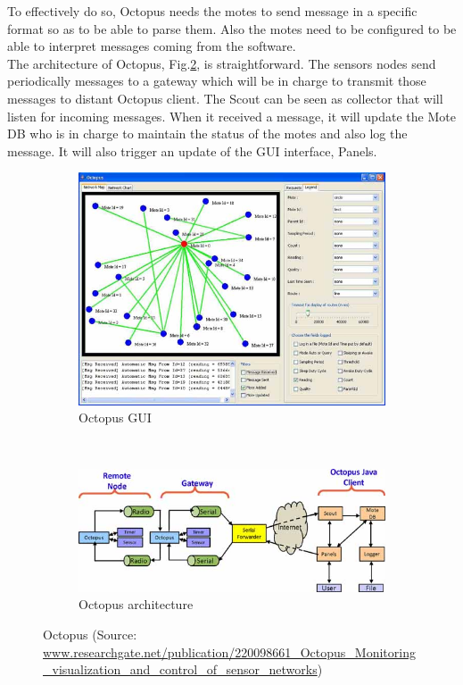 To effectively do so, Octopus needs the motes to send message in a specific format so as to be able to parse them. Also the motes need to be configured to be able to interpret messages coming from the software.\\

The architecture of Octopus, Fig.\ref{fig:octopus_archi}, is straightforward. The sensors nodes send periodically messages to a gateway which will be in charge to transmit those messages to distant Octopus client. The Scout can be seen as collector that will listen for incoming messages. When it received a message, it will update the Mote DB who is in charge to maintain the status of the motes and also log the message. It will also trigger an update of the GUI interface, Panels.

\begin{figure}
    \centering
    \begin{subfigure}[b]{0.5\textwidth}
      \includegraphics[width=\textwidth]{res/octopus.png}
      \caption{Octopus GUI}
      \label{fig:octopus_gui}
    \end{subfigure}
    ~
    \begin{subfigure}[b]{0.5\textwidth}
        \includegraphics[width=\textwidth]{res/octopus_archi.png}
        \caption{Octopus architecture}
        \label{fig:octopus_archi}
    \end{subfigure}
    \caption{Octopus (Source: \url{www.researchgate.net/publication/220098661_Octopus_Monitoring_visualization_and_control_of_sensor_networks})}
    \label{fig:octopus}
\end{figure}

